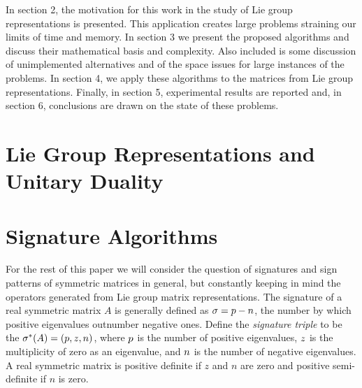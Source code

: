 \documentclass{sig-alternate}
\begin{document}
In section 2, the motivation for this work in the study of Lie group
representations is presented.  This application creates large problems
straining our limits of time and memory.
In section 3 we present the proposed algorithms and discuss their mathematical
basis and complexity.
Also included is some discussion
of unimplemented alternatives and of the space issues for large instances
of the problems. In section 4, we apply these algorithms to the matrices from 
Lie group representations.
Finally, in section 5, experimental results are reported
and, in section 6, conclusions are drawn on the state of these problems.

\section{Lie Group Representations and Unitary Duality}


\section{Signature Algorithms} %

For the rest of this paper we will consider the question of signatures and
sign patterns
of symmetric matrices in general, but constantly keeping in mind the 
operators generated from Lie group matrix representations.
The signature of a real symmetric matrix $A$ is 
generally defined as $\sigma = p - n$, the number by which positive eigenvalues 
outnumber negative ones.  
Define the {\em signature triple} to be the 
$\sigma^{*}(A) = (p, z, n)$, 
where $p$ is the number of positive eigenvalues, $z$ is the 
multiplicity of zero as an eigenvalue, and $n$ is the number of negative eigenvalues.
A real symmetric matrix is 
positive definite if $z$ and $n$ are zero and 
positive semi-definite if $n$ is zero.
\end{document}
